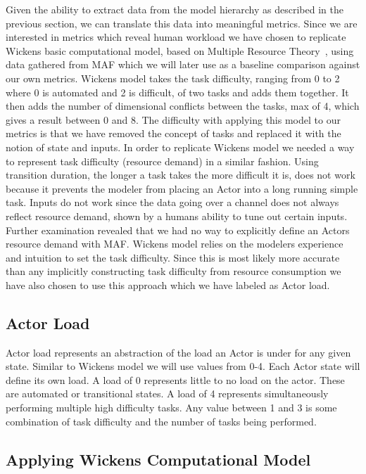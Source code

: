 Given the ability to extract data from the model hierarchy as described in the previous section, we can translate this data into meaningful metrics.  Since we are interested in metrics which reveal human workload we have chosen to replicate Wickens basic computational model, based on Multiple Resource Theory~\cite{wickens2002multiple}, using data gathered from MAF which we will later use as a baseline comparison against our own metrics.  Wickens model takes the task difficulty, ranging from 0 to 2 where 0 is automated and 2 is difficult, of two tasks and adds them together.  It then adds the number of dimensional conflicts between the tasks, max of 4, which gives a result between 0 and 8.
	The difficulty with applying this model to our metrics is that we have removed the concept of tasks and replaced it with the notion of state and inputs.  In order to replicate Wickens model we needed a way to represent task difficulty (resource demand) in a similar fashion.  Using transition duration, the longer a task takes the more difficult it is, does not work because it prevents the modeler from placing an Actor into a long running simple task.  Inputs do not work since the data going over a channel does not always reflect resource demand, shown by a humans ability to tune out certain inputs.  Further examination revealed that we had no way to explicitly define an Actors resource demand with MAF.  Wickens model relies on the modelers experience and intuition to set the task difficulty.  Since this is most likely more accurate than any implicitly constructing task difficulty from resource consumption we have also chosen to use this approach which we have labeled as Actor load.
	
\subsection{Actor Load}
Actor load represents an abstraction of the load an Actor is under for any given state.  Similar to Wickens model we will use values from 0-4.  Each Actor state will define its own load.  A load of 0 represents little to no load on the actor.  These are automated or transitional states.  A load of 4 represents simultaneously performing multiple high difficulty tasks.  Any value between 1 and 3 is some combination of task difficulty and the number of tasks being performed.

\subsection{Applying Wickens Computational Model}

